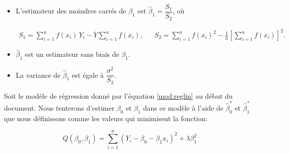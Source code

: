 \begin{questions}
\begin{itemize}
\item L'estimateur des moindres carrés de $\beta_1$ est $\widehat{\beta}_1= \dfrac{S_1}{S_2}$, où  

\begin{align*}
    S_1= \sum\limits_{i=1}^n f(x_i)\,Y_i - \overline{Y}\sum\limits_{i=1}^nf(x_i), & & S_2=\sum\limits_{i=1}^n f(x_i)^2-\frac{1}{n}\left[\sum\limits_{i=1}^nf(x_i)\right]^2.
\end{align*}

\item $\widehat{\beta}_1$ est un estimateur sans biais de $\beta_1$.
\item La variance de $\widehat{\beta}_1$ est égale à $\dfrac{\sigma^2}{S_2}$. %
\end{itemize}



\vspace{2cm}
\question

Soit le modèle de régression donné par l'équation \eqref{mod:reglin} au début du document. Nous tenterons d'estimer $\beta_0$ et $\beta_1$ dans ce modèle à l'aide de $\widehat{\beta}_0^*$ et $\widehat{\beta}_1^*$ que nous définissons comme les valeurs qui minimisent la fonction:

\begin{equation*}
   Q(\beta_0, \beta_1)= \sum_{i=1}^n(Y_i-\beta_0- \beta_1x_i)^2 + \lambda \beta_1 ^2
\end{equation*}


\end{questions}
